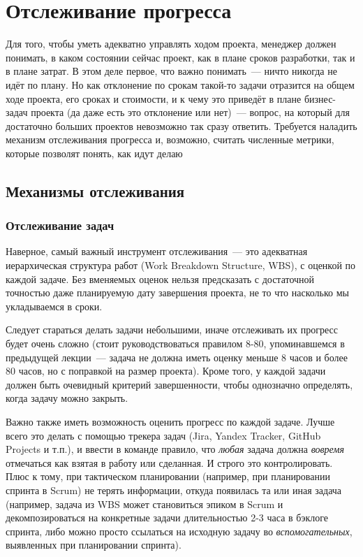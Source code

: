 \documentclass{../../text-style}
\begin{document}
\maketitle
\thispagestyle{empty}


\section{Отслеживание прогресса}

Для того, чтобы уметь адекватно управлять ходом проекта, менеджер должен понимать, в каком состоянии сейчас проект, как в плане сроков разработки, так и в плане затрат. В этом деле первое, что важно понимать~--- ничто никогда не идёт по плану. Но как отклонение по срокам такой-то задачи отразится на общем ходе проекта, его сроках и стоимости, и к чему это приведёт в плане бизнес-задач проекта (да даже есть это отклонение или нет)~--- вопрос, на который для достаточно больших проектов невозможно так сразу ответить. Требуется наладить механизм отслеживания прогресса и, возможно, считать численные метрики, которые позволят понять, как идут делаю

\subsection{Механизмы отслеживания}

\subsubsection{Отслеживание задач}

Наверное, самый важный инструмент отслеживания~--- это адекватная иерархическая структура работ (Work Breakdown Structure, WBS), с оценкой по каждой задаче. Без вменяемых оценок нельзя предсказать с достаточной точностью даже планируемую дату завершения проекта, не то что насколько мы укладываемся в сроки.

Следует стараться делать задачи небольшими, иначе отслеживать их прогресс будет очень сложно (стоит руководствоваться правилом 8-80, упоминавшемся в предыдущей лекции~--- задача не должна иметь оценку меньше 8 часов и более 80 часов, но с поправкой на размер проекта). Кроме того, у каждой задачи должен быть очевидный критерий завершенности, чтобы однозначно определять, когда задачу можно закрыть.

Важно также иметь возможность оценить прогресс по каждой задаче. Лучше всего это делать с помощью трекера задач (Jira, Yandex Tracker, GitHub Projects и т.п.), и ввести в команде правило, что \emph{любая} задача должна \emph{вовремя} отмечаться как взятая в работу или сделанная. И строго это контролировать. Плюс к тому, при тактическом планировании (например, при планировании спринта в Scrum) не терять информации, откуда появилась та или иная задача (например, задача из WBS может становиться эпиком в Scrum и декомпозироваться на конкретные задачи длительностью 2-3 часа в бэклоге спринта, либо можно просто ссылаться на исходную задачу во \emph{вспомогательных}, выявленных при планировании спринта).
\end{document}
